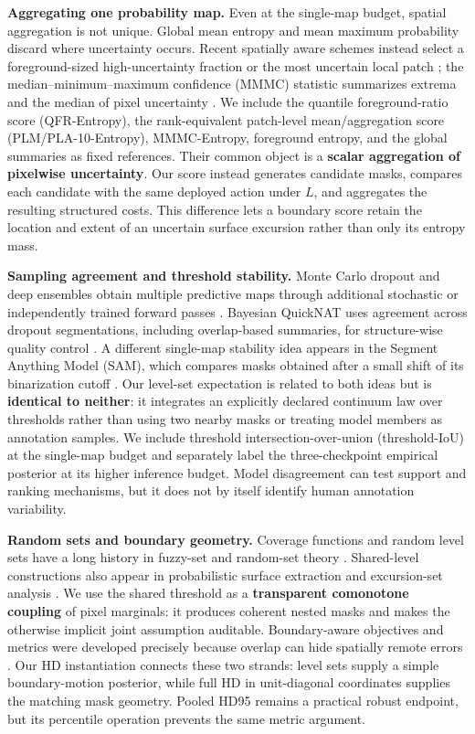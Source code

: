 \noindent\textbf{Aggregating one probability map.}
Even at the single-map budget, spatial aggregation is not unique. Global mean
entropy and mean maximum probability discard where uncertainty occurs. Recent
spatially aware schemes instead select a foreground-sized high-uncertainty
fraction or the most uncertain local patch \citep{guarino2026aggregation}; the
median--minimum--maximum confidence (MMMC) statistic summarizes extrema and the
median of pixel uncertainty \citep{holder2021uncertainty}. We include the
quantile foreground-ratio score (QFR-Entropy), the rank-equivalent patch-level
mean/aggregation score (PLM/PLA-10-Entropy), MMMC-Entropy, foreground entropy,
and the global summaries
as fixed references. Their common object is a \textbf{scalar aggregation of pixelwise
uncertainty}. Our score instead generates candidate masks, compares each candidate
with the same deployed action under \(L\), and aggregates the resulting
structured costs. This difference lets a boundary score retain the location and
extent of an uncertain surface excursion rather than only its entropy mass.

\noindent\textbf{Sampling agreement and threshold stability.}
Monte Carlo dropout and deep ensembles obtain multiple predictive maps through
additional stochastic or independently trained forward passes
\citep{gal2016dropout,lakshminarayanan2017ensembles}. Bayesian QuickNAT uses
agreement across dropout segmentations, including overlap-based summaries, for
structure-wise quality control \citep{roy2019bayesianquicknat}. A different
single-map stability idea appears in the Segment Anything Model (SAM), which
compares masks obtained after a
small shift of its binarization cutoff \citep{kirillov2023segmentanything}.
Our level-set expectation is related to both ideas but is \textbf{identical to neither}:
it integrates an explicitly declared continuum law over thresholds rather than
using two nearby masks or treating model members as annotation samples. We
include threshold intersection-over-union (threshold-IoU) at the single-map
budget and separately label the
three-checkpoint empirical posterior at its higher inference budget. Model
disagreement can test support and ranking mechanisms, but it does not by itself
identify human annotation variability.

\noindent\textbf{Random sets and boundary geometry.}
Coverage functions and random level sets have a long history in fuzzy-set and
random-set theory \citep{goodman,molchanov}. Shared-level constructions also
appear in probabilistic surface extraction and excursion-set analysis
\citep{poethkow,bolin}. We use the shared threshold as a \textbf{transparent comonotone
coupling} of pixel marginals: it produces coherent nested masks and makes the
otherwise implicit joint assumption auditable. Boundary-aware objectives and
metrics were developed precisely because overlap can hide spatially remote
errors \citep{karimi2020}. Our HD instantiation connects these two strands:
level sets supply a simple boundary-motion posterior, while full HD in
unit-diagonal coordinates supplies the matching mask geometry. Pooled HD95 remains a
practical robust endpoint, but its percentile operation prevents the same metric
argument.

